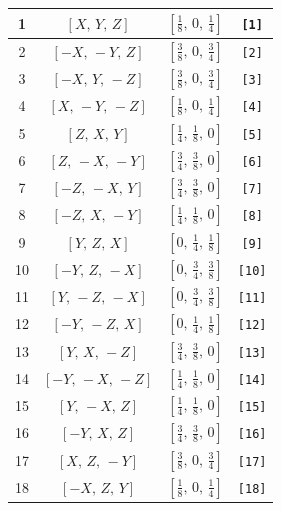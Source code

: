 \documentclass[fleqn,8pt]{jsarticle}
\begin{document}
\begin{longtable}{cccc}
1 & $\left[ X,\, Y,\, Z \right]$ & $\left[ \frac{1}{8},\, 0,\, \frac{1}{4} \right]$ & {\tt [1]} \\ \hline
2 & $\left[ - X,\, - Y,\, Z \right]$ & $\left[ \frac{3}{8},\, 0,\, \frac{3}{4} \right]$ & {\tt [2]} \\ \hline
3 & $\left[ - X,\, Y,\, - Z \right]$ & $\left[ \frac{3}{8},\, 0,\, \frac{3}{4} \right]$ & {\tt [3]} \\ \hline
4 & $\left[ X,\, - Y,\, - Z \right]$ & $\left[ \frac{1}{8},\, 0,\, \frac{1}{4} \right]$ & {\tt [4]} \\ \hline
5 & $\left[ Z,\, X,\, Y \right]$ & $\left[ \frac{1}{4},\, \frac{1}{8},\, 0 \right]$ & {\tt [5]} \\ \hline
6 & $\left[ Z,\, - X,\, - Y \right]$ & $\left[ \frac{3}{4},\, \frac{3}{8},\, 0 \right]$ & {\tt [6]} \\ \hline
7 & $\left[ - Z,\, - X,\, Y \right]$ & $\left[ \frac{3}{4},\, \frac{3}{8},\, 0 \right]$ & {\tt [7]} \\ \hline
8 & $\left[ - Z,\, X,\, - Y \right]$ & $\left[ \frac{1}{4},\, \frac{1}{8},\, 0 \right]$ & {\tt [8]} \\ \hline
9 & $\left[ Y,\, Z,\, X \right]$ & $\left[ 0,\, \frac{1}{4},\, \frac{1}{8} \right]$ & {\tt [9]} \\ \hline
10 & $\left[ - Y,\, Z,\, - X \right]$ & $\left[ 0,\, \frac{3}{4},\, \frac{3}{8} \right]$ & {\tt [10]} \\ \hline
11 & $\left[ Y,\, - Z,\, - X \right]$ & $\left[ 0,\, \frac{3}{4},\, \frac{3}{8} \right]$ & {\tt [11]} \\ \hline
12 & $\left[ - Y,\, - Z,\, X \right]$ & $\left[ 0,\, \frac{1}{4},\, \frac{1}{8} \right]$ & {\tt [12]} \\ \hline
13 & $\left[ Y,\, X,\, - Z \right]$ & $\left[ \frac{3}{4},\, \frac{3}{8},\, 0 \right]$ & {\tt [13]} \\ \hline
14 & $\left[ - Y,\, - X,\, - Z \right]$ & $\left[ \frac{1}{4},\, \frac{1}{8},\, 0 \right]$ & {\tt [14]} \\ \hline
15 & $\left[ Y,\, - X,\, Z \right]$ & $\left[ \frac{1}{4},\, \frac{1}{8},\, 0 \right]$ & {\tt [15]} \\ \hline
16 & $\left[ - Y,\, X,\, Z \right]$ & $\left[ \frac{3}{4},\, \frac{3}{8},\, 0 \right]$ & {\tt [16]} \\ \hline
17 & $\left[ X,\, Z,\, - Y \right]$ & $\left[ \frac{3}{8},\, 0,\, \frac{3}{4} \right]$ & {\tt [17]} \\ \hline
18 & $\left[ - X,\, Z,\, Y \right]$ & $\left[ \frac{1}{8},\, 0,\, \frac{1}{4} \right]$ & {\tt [18]} \\ \hline

\end{longtable}
\end{document}
